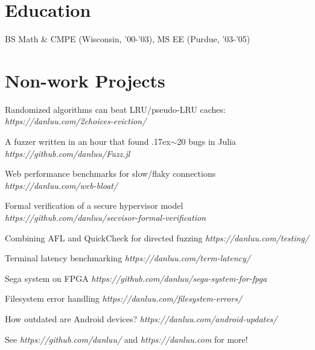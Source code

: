 \documentclass[letterpaper]{scrartcl}
\begin{document}
\section*{Education}
\begin{list1}
\item
  \begin{tabular1bold}BS Math \& CMPE (Wisconsin, '00-'03), MS EE (Purdue, '03-'05)\end{tabular1bold}
\end{list1}

\section*{Non-work Projects}
\begin{list1}
\item
  \begin{list2}
    \item Randomized algorithms can beat LRU/pseudo-LRU caches:  \hfill \emph{https://danluu.com/2choices-eviction/}
    \item A fuzzer written in an hour that found {\raise.17ex\hbox{$\scriptstyle\mathtt{\sim}$}}20 bugs in Julia \hfill \emph{https://github.com/danluu/Fuzz.jl}
    \item Web performance benchmarks for slow/flaky connections \hfill \emph{https://danluu.com/web-bloat/}
    \item Formal verification of a secure hypervisor model \hfill \emph{https://github.com/danluu/secvisor-formal-verification}
    \item Combining AFL and QuickCheck for directed fuzzing \hfill \emph{https://danluu.com/testing/}
    \item Terminal latency benchmarking \hfill \emph{https://danluu.com/term-latency/}
    \item Sega system on FPGA \hfill \emph{https://github.com/danluu/sega-system-for-fpga}
    \item Filesystem error handling \hfill \emph{https://danluu.com/filesystem-errors/}
    \item How outdated are Android devices? \hfill \emph{https://danluu.com/android-updates/}
    \item See \emph{https://github.com/danluu/} and \emph{https://danluu.com} for more!
  \end{list2}
\end{list1}
\end{document}

